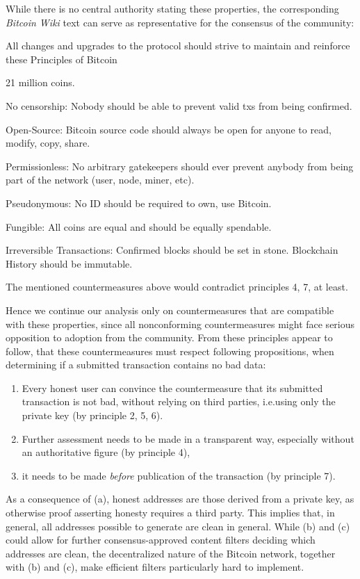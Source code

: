 \documentclass[a4paper,11pt,titlepage]{scrbook}
\begin{document}
While there is no central authority stating these properties, the corresponding \emph{Bitcoin Wiki} text can serve as representative for the consensus of the community:
\begin{displayquote}
    \noindent
    All changes and upgrades to the protocol should strive to maintain and reinforce these Principles of Bitcoin

    \begin{enumerate}[label={[}\arabic*.{]}]
        \item 21 million coins.
        \item No censorship: Nobody should be able to prevent valid txs from being confirmed.
        \item Open-Source: Bitcoin source code should always be open for anyone to read, modify, copy, share.
        \item Permissionless: No arbitrary gatekeepers should ever prevent anybody from being part of the network (user, node, miner, etc).
        \item Pseudonymous: No ID should be required to own, use Bitcoin.
        \item Fungible: All coins are equal and should be equally spendable.
        \item Irreversible Transactions: Confirmed blocks should be set in stone. Blockchain History should be immutable. \cite{bitcoinwiki_principles_2017}
    \end{enumerate}
\end{displayquote}
The mentioned countermeasures above would contradict principles 4, 7, at least.

Hence we continue our analysis only on countermeasures that are compatible with these properties,
since all nonconforming countermeasures might face serious opposition to adoption from the community.
From these principles appear to follow, that these countermeasures must respect following propositions, when determining if a submitted transaction contains no bad data:
\begin{enumerate}
    \item Every honest user can convince the countermeasure that its submitted transaction is not bad, without relying on third parties, i.e.\@ using only the private key (by principle 2, 5, 6).
    \item Further assessment needs to be made in a transparent way, especially without an authoritative figure (by principle 4),
    \item it needs to be made \emph{before} publication of the transaction (by principle 7).
\end{enumerate}
As a consequence of (a), honest addresses are those derived from a private key, as otherwise proof asserting honesty requires a third party.
This implies that, in general, all addresses possible to generate are clean in general.
While (b) and (c) could allow for further consensus-approved content filters deciding which addresses are clean, the decentralized nature of the Bitcoin network, together with (b) and (c), make efficient filters particularly hard to implement.
\end{document}
